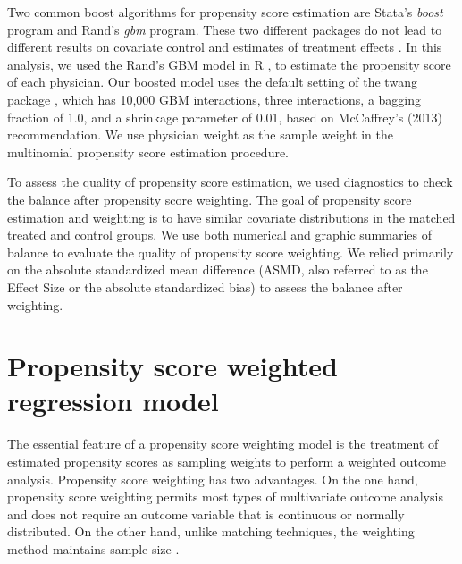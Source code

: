 \documentclass[12pt]{report}
\begin{document}
Two common boost algorithms for propensity score estimation are Stata's \textit{boost} program and Rand's \textit{gbm} program. These two different packages do not lead to different results on covariate control and estimates of treatment effects \citep{guo2014propensity}. In this analysis, we used the Rand's GBM model \citep{mccaffrey2004propensity} in R \citep{rbase}, to estimate the propensity score of each physician. Our boosted model uses the default setting of the twang package \citep{mccaffrey2013tutorial}, which has 10,000 GBM interactions, three interactions, a bagging fraction of 1.0, and a shrinkage parameter of 0.01, based on McCaffrey's (2013) recommendation. We use physician weight as the sample weight in the multinomial propensity score estimation procedure.

To assess the quality of propensity score estimation, we used diagnostics to check the balance after propensity score weighting. The goal of propensity score estimation and weighting is to have similar covariate distributions in the matched treated and control groups. We use both numerical and graphic summaries of balance to evaluate the quality of propensity score weighting. We relied primarily on the absolute standardized mean difference (ASMD, also referred to as the Effect Size or the absolute standardized bias) to assess the balance after weighting. 

\section{Propensity score weighted regression model}
The essential feature of a propensity score weighting model is the treatment of estimated propensity scores as sampling weights to perform a weighted outcome analysis. Propensity score weighting has two advantages. On the one hand, propensity score weighting permits most types of multivariate outcome analysis and does not require an outcome variable that is continuous or normally distributed. On the other hand, unlike matching techniques, the weighting method maintains sample size \citep{guo2014propensity}.
\end{document}
